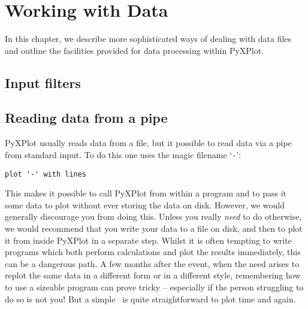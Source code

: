 %
%
%
%
%



\chapter{Working with Data}
\label{ch:numerics}

In this chapter, we describe more sophisticated ways of dealing with data files
and outline the facilities provided for data processing within PyXPlot.

\section{Input filters}

\section{Reading data from a pipe}

PyXPlot usually reads data from a file, but it possible to read data via a pipe
from standard input.  To do this one uses the magic filename `{\tt -}':

\begin{verbatim}
plot '-' with lines
\end{verbatim}

This makes it possible to call PyXPlot from within a program and to pass it
some data to plot without ever storing the data on disk.  However, we would
generally discourage you from doing this. Unless you really {\it need} to do
otherwise, we would recommend that you write your data to a file on disk, and
then to plot it from inside PyXPlot in a separate step.  Whilst it is often
tempting to write programs which both perform calculations and plot the results
immediately, this can be a dangerous path. A few months after the event, when
the need arises to replot the same data in a different form or in a different
style, remembering how to use a sizeable program can prove tricky -- especially
if the person struggling to do so is not you! But a simple \datafile\ is quite
straightforward to plot time and again.

